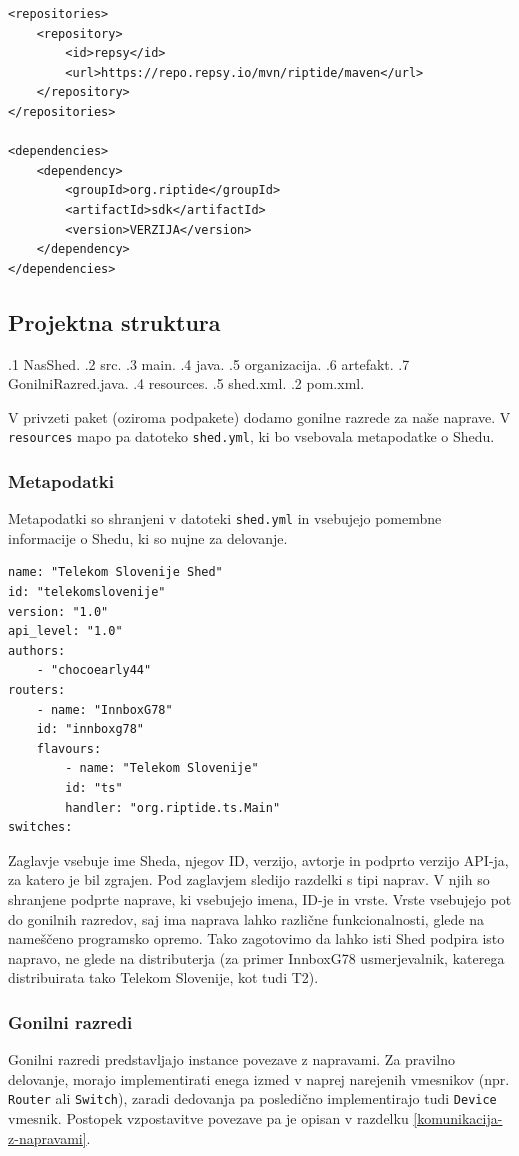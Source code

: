 \documentclass[12pt]{article}
\begin{document}
\begin{lstlisting}[style=XmlStyle]
<repositories>
	<repository>
		<id>repsy</id>
		<url>https://repo.repsy.io/mvn/riptide/maven</url>
	</repository>
</repositories>

<dependencies>
	<dependency>
		<groupId>org.riptide</groupId>
		<artifactId>sdk</artifactId>
		<version>VERZIJA</version>
	</dependency>
</dependencies>
\end{lstlisting}
\newpage

\subsection{Projektna struktura} \label{projektna-struktura}
\begin{dirtree}{%
.1 NasShed.
	.2 src.
		.3 main.
			.4 java.
				.5 organizacija.
					.6 artefakt.
						.7 GonilniRazred.java.
			.4 resources.
				.5 shed.xml.
	.2 pom.xml.
}
\end{dirtree}
\vspace*{12pt}
V privzeti paket (oziroma podpakete) dodamo gonilne razrede za naše naprave.
V \texttt{resources} mapo pa datoteko \texttt{shed.yml}, ki bo vsebovala
metapodatke o Shedu.

\subsubsection{Metapodatki}
Metapodatki so shranjeni v datoteki \texttt{shed.yml} in vsebujejo pomembne
informacije o Shedu, ki so nujne za delovanje.

\begin{lstlisting}[style=XmlStyle]
name: "Telekom Slovenije Shed"
id: "telekomslovenije"
version: "1.0"
api_level: "1.0"
authors:
	- "chocoearly44"
routers:
	- name: "InnboxG78"
	id: "innboxg78"
	flavours:
		- name: "Telekom Slovenije"
		id: "ts"
		handler: "org.riptide.ts.Main"
switches:
\end{lstlisting}
Zaglavje vsebuje ime Sheda, njegov ID, verzijo, avtorje in podprto verzijo
API-ja, za katero je bil zgrajen. Pod zaglavjem sledijo razdelki s tipi
naprav. V njih so shranjene podprte naprave, ki vsebujejo imena, ID-je in
vrste. Vrste vsebujejo pot do gonilnih razredov, saj ima naprava lahko
različne funkcionalnosti, glede na nameščeno programsko opremo. Tako
zagotovimo da lahko isti Shed podpira isto napravo, ne glede na
distributerja (za primer InnboxG78 usmerjevalnik, katerega distribuirata
tako Telekom Slovenije, kot tudi T2).

\subsubsection{Gonilni razredi}
Gonilni razredi predstavljajo instance povezave z napravami. Za pravilno
delovanje, morajo implementirati enega izmed v naprej narejenih vmesnikov
(npr. \texttt{Router} ali \texttt{Switch}), zaradi dedovanja pa posledično
implementirajo tudi \texttt{Device} vmesnik. Postopek vzpostavitve povezave
pa je opisan v razdelku \ref{komunikacija-z-napravami}.
\end{document}

